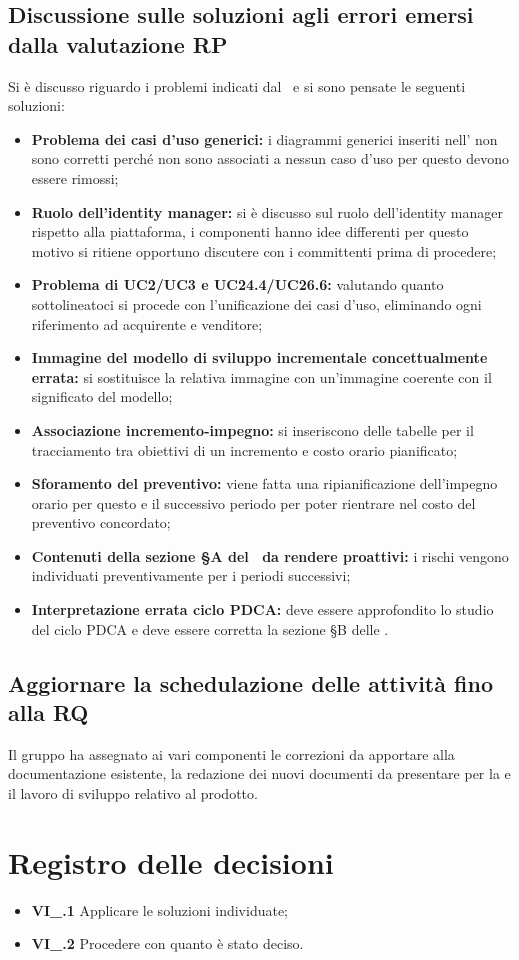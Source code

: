\subsection{Discussione sulle soluzioni agli errori emersi dalla valutazione RP}
Si è discusso riguardo i problemi indicati dal \VT\ e si sono pensate le seguenti soluzioni:
\begin{itemize}
	\item \textbf{Problema dei casi d'uso generici:} i diagrammi generici inseriti nell' non sono corretti perché non sono associati a nessun caso d'uso per questo devono essere rimossi;
	\item \textbf{Ruolo dell'identity manager:} si è discusso sul ruolo dell'identity manager rispetto alla piattaforma, i componenti hanno idee differenti per questo motivo si ritiene opportuno discutere con i committenti prima di procedere;
	\item \textbf{Problema di UC2/UC3 e UC24.4/UC26.6:} valutando quanto sottolineatoci si procede con l'unificazione dei casi d'uso, eliminando ogni riferimento ad acquirente e venditore;
	\item \textbf{Immagine del modello di sviluppo incrementale concettualmente errata:} si sostituisce la relativa immagine con un'immagine coerente con il significato del modello;
	\item \textbf{Associazione incremento-impegno:} si inseriscono delle tabelle per il tracciamento tra obiettivi di un incremento e costo orario pianificato;
	\item \textbf{Sforamento del preventivo:} viene fatta una ripianificazione dell'impegno orario per questo e il successivo periodo per poter rientrare nel costo del preventivo concordato;
	\item \textbf{Contenuti della sezione \S{}A del \PdP\ da rendere proattivi:} i rischi vengono individuati preventivamente per i periodi successivi;
	\item \textbf{Interpretazione errata ciclo PDCA:} deve essere approfondito lo studio del ciclo PDCA e deve essere corretta la sezione \S{}B delle \NdP.
\end{itemize}
\subsection{Aggiornare la schedulazione delle attività fino alla RQ}
Il gruppo ha assegnato ai vari componenti le correzioni da apportare alla documentazione esistente, la redazione dei nuovi documenti da presentare per la  e il lavoro di sviluppo relativo al prodotto.

\section{Registro delle decisioni}
\begin{itemize}
	\item \textbf{VI\_\Data.1} Applicare le soluzioni individuate;
	\item \textbf{VI\_\Data.2} Procedere con quanto è stato deciso.
\end{itemize}